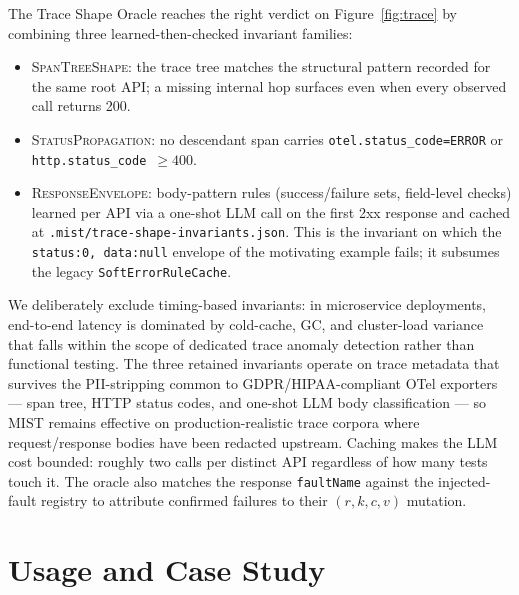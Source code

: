 \documentclass[10pt,conference]{IEEEtran}
\begin{document}
The Trace Shape Oracle reaches the right verdict on Figure~\ref{fig:trace} by combining three learned-then-checked invariant families:
\begin{itemize}\setlength{\itemsep}{1pt}
  \item \textsc{SpanTreeShape}: the trace tree matches the structural pattern recorded for the same root API; a missing internal hop surfaces even when every observed call returns 200.
  \item \textsc{StatusPropagation}: no descendant span carries \texttt{otel.\allowbreak status\_code=ERROR} or \texttt{http.status\_code}~$\geq 400$.
  \item \textsc{ResponseEnvelope}: body-pattern rules (success/failure sets, field-level checks) learned per API via a one-shot LLM call on the first 2xx response and cached at \texttt{.mist/trace-shape-invariants.json}. This is the invariant on which the \texttt{status:0, data:null} envelope of the motivating example fails; it subsumes the legacy \texttt{SoftErrorRuleCache}.
\end{itemize}
We deliberately exclude timing-based invariants: in microservice deployments, end-to-end latency is dominated by cold-cache, GC, and cluster-load variance that falls within the scope of dedicated trace anomaly detection rather than functional testing. The three retained invariants operate on trace metadata that survives the PII-stripping common to GDPR/HIPAA-compliant OTel exporters --- span tree, HTTP status codes, and one-shot LLM body classification --- so MIST remains effective on production-realistic trace corpora where request/response bodies have been redacted upstream. Caching makes the LLM cost bounded: roughly two calls per distinct API regardless of how many tests touch it. The oracle also matches the response \texttt{faultName} against the injected-fault registry to attribute confirmed failures to their $(r, k, c, v)$ mutation.

\section{Usage and Case Study}\label{sec:case}
\end{document}
